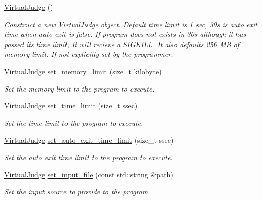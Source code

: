 \begin{DoxyCompactItemize}
\item 
\mbox{\hyperlink{classtestcaser_1_1integrator_1_1VirtualJudge_a10b68744cc523bcc8abe1ddca7a281dc}{Virtual\+Judge}} ()
\begin{DoxyCompactList}\small\item\em Construct a new \mbox{\hyperlink{classtestcaser_1_1integrator_1_1VirtualJudge}{Virtual\+Judge}} object. Default time limit is 1 sec, 30s is auto exit time when auto exit is false. If program does not exists in 30s although it has passed its time limit, It will recieve a S\+I\+G\+K\+I\+LL. It also defaults 256 MB of memory limit. If not explicitly set by the programmer. \end{DoxyCompactList}\item 
\mbox{\hyperlink{classtestcaser_1_1integrator_1_1VirtualJudge}{Virtual\+Judge}} \mbox{\hyperlink{classtestcaser_1_1integrator_1_1VirtualJudge_a8ac8e323d9f69fb4e1f6ee2e9aa1ae9f}{set\+\_\+memory\+\_\+limit}} (size\+\_\+t kilobyte)
\begin{DoxyCompactList}\small\item\em Set the memory limit to the program to execute. \end{DoxyCompactList}\item 
\mbox{\hyperlink{classtestcaser_1_1integrator_1_1VirtualJudge}{Virtual\+Judge}} \mbox{\hyperlink{classtestcaser_1_1integrator_1_1VirtualJudge_a121272932bb115881ad90be79ad7d0a7}{set\+\_\+time\+\_\+limit}} (size\+\_\+t ssec)
\begin{DoxyCompactList}\small\item\em Set the time limit to the program to execute. \end{DoxyCompactList}\item 
\mbox{\hyperlink{classtestcaser_1_1integrator_1_1VirtualJudge}{Virtual\+Judge}} \mbox{\hyperlink{classtestcaser_1_1integrator_1_1VirtualJudge_ac739270769d85fd09ae35aa53726f8f4}{set\+\_\+auto\+\_\+exit\+\_\+time\+\_\+limit}} (size\+\_\+t ssec)
\begin{DoxyCompactList}\small\item\em Set the auto exit time limit to the program to execute. \end{DoxyCompactList}\item 
\mbox{\hyperlink{classtestcaser_1_1integrator_1_1VirtualJudge}{Virtual\+Judge}} \mbox{\hyperlink{classtestcaser_1_1integrator_1_1VirtualJudge_a2ac1d116076a4ee8fde3ddd1f0849309}{set\+\_\+input\+\_\+file}} (const std\+::string \&path)
\begin{DoxyCompactList}\small\item\em Set the input source to provide to the program. \end{DoxyCompactList}\item 

\end{DoxyCompactItemize}
